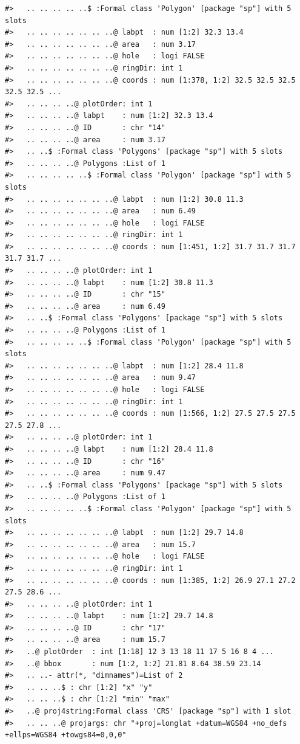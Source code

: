 \documentclass[12pt,a4paper,a4paper]{book}
\theoremstyle{definition}
\theoremstyle{definition}
\theoremstyle{definition}
\theoremstyle{remark}
\begin{document}
\begin{verbatim}
#>   .. .. .. .. ..$ :Formal class 'Polygon' [package "sp"] with 5 slots
#>   .. .. .. .. .. .. ..@ labpt  : num [1:2] 32.3 13.4
#>   .. .. .. .. .. .. ..@ area   : num 3.17
#>   .. .. .. .. .. .. ..@ hole   : logi FALSE
#>   .. .. .. .. .. .. ..@ ringDir: int 1
#>   .. .. .. .. .. .. ..@ coords : num [1:378, 1:2] 32.5 32.5 32.5 32.5 32.5 ...
#>   .. .. .. ..@ plotOrder: int 1
#>   .. .. .. ..@ labpt    : num [1:2] 32.3 13.4
#>   .. .. .. ..@ ID       : chr "14"
#>   .. .. .. ..@ area     : num 3.17
#>   .. ..$ :Formal class 'Polygons' [package "sp"] with 5 slots
#>   .. .. .. ..@ Polygons :List of 1
#>   .. .. .. .. ..$ :Formal class 'Polygon' [package "sp"] with 5 slots
#>   .. .. .. .. .. .. ..@ labpt  : num [1:2] 30.8 11.3
#>   .. .. .. .. .. .. ..@ area   : num 6.49
#>   .. .. .. .. .. .. ..@ hole   : logi FALSE
#>   .. .. .. .. .. .. ..@ ringDir: int 1
#>   .. .. .. .. .. .. ..@ coords : num [1:451, 1:2] 31.7 31.7 31.7 31.7 31.7 ...
#>   .. .. .. ..@ plotOrder: int 1
#>   .. .. .. ..@ labpt    : num [1:2] 30.8 11.3
#>   .. .. .. ..@ ID       : chr "15"
#>   .. .. .. ..@ area     : num 6.49
#>   .. ..$ :Formal class 'Polygons' [package "sp"] with 5 slots
#>   .. .. .. ..@ Polygons :List of 1
#>   .. .. .. .. ..$ :Formal class 'Polygon' [package "sp"] with 5 slots
#>   .. .. .. .. .. .. ..@ labpt  : num [1:2] 28.4 11.8
#>   .. .. .. .. .. .. ..@ area   : num 9.47
#>   .. .. .. .. .. .. ..@ hole   : logi FALSE
#>   .. .. .. .. .. .. ..@ ringDir: int 1
#>   .. .. .. .. .. .. ..@ coords : num [1:566, 1:2] 27.5 27.5 27.5 27.5 27.8 ...
#>   .. .. .. ..@ plotOrder: int 1
#>   .. .. .. ..@ labpt    : num [1:2] 28.4 11.8
#>   .. .. .. ..@ ID       : chr "16"
#>   .. .. .. ..@ area     : num 9.47
#>   .. ..$ :Formal class 'Polygons' [package "sp"] with 5 slots
#>   .. .. .. ..@ Polygons :List of 1
#>   .. .. .. .. ..$ :Formal class 'Polygon' [package "sp"] with 5 slots
#>   .. .. .. .. .. .. ..@ labpt  : num [1:2] 29.7 14.8
#>   .. .. .. .. .. .. ..@ area   : num 15.7
#>   .. .. .. .. .. .. ..@ hole   : logi FALSE
#>   .. .. .. .. .. .. ..@ ringDir: int 1
#>   .. .. .. .. .. .. ..@ coords : num [1:385, 1:2] 26.9 27.1 27.2 27.5 28.6 ...
#>   .. .. .. ..@ plotOrder: int 1
#>   .. .. .. ..@ labpt    : num [1:2] 29.7 14.8
#>   .. .. .. ..@ ID       : chr "17"
#>   .. .. .. ..@ area     : num 15.7
#>   ..@ plotOrder  : int [1:18] 12 3 13 18 11 17 5 16 8 4 ...
#>   ..@ bbox       : num [1:2, 1:2] 21.81 8.64 38.59 23.14
#>   .. ..- attr(*, "dimnames")=List of 2
#>   .. .. ..$ : chr [1:2] "x" "y"
#>   .. .. ..$ : chr [1:2] "min" "max"
#>   ..@ proj4string:Formal class 'CRS' [package "sp"] with 1 slot
#>   .. .. ..@ projargs: chr "+proj=longlat +datum=WGS84 +no_defs +ellps=WGS84 +towgs84=0,0,0"
\end{verbatim}
\end{document}
